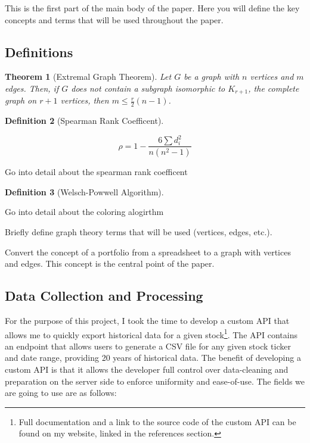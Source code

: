 \documentclass{article}
\newtheorem{theorem}{Theorem}[section]
\newtheorem{definition}[theorem]{Definition}
\begin{document}
This is the first part of the main body of the paper. Here you will define the key concepts and terms that will be used throughout the paper.

\subsection{Definitions}


\begin{theorem}[Extremal Graph Theorem]
    Let $G$ be a graph with $n$ vertices and $m$ edges. Then, if $G$ does not contain a subgraph isomorphic to $K_{r+1}$, the complete graph on $r+1$ vertices, then $m \leq \frac{r}{2}(n-1)$.
\end{theorem}


\begin{definition}[Spearman Rank Coefficent]
\end{definition}

\[
\rho = 1 - \frac{6 \sum d_i^2}{n(n^2-1)}
\]

Go into detail about the spearman rank coefficent


\begin{definition}[Welsch-Powwell Algorithm]
\end{definition}

Go into detail about the coloring alogirthm



Briefly define graph theory terms that will be used (vertices, edges, etc.). 


Convert the concept of a portfolio from a spreadsheet to a graph with vertices and edges. This concept is the central point of the paper.


\subsection{Data Collection and Processing}

For the purpose of this project, I took the time to develop a custom API that allows me to quickly export historical data for a given stock\footnote{Full documentation and a link to the source code of the custom API can be found on my website, linked in the references section.}. The API contains an endpoint that allows users to generate a CSV file for any given stock ticker and date range, providing 20 years of historical data. The benefit of developing a custom API is that it allows the developer full control over data-cleaning and preparation on the server side to enforce uniformity and ease-of-use. The fields we are going to use are as follows:
\end{document}
